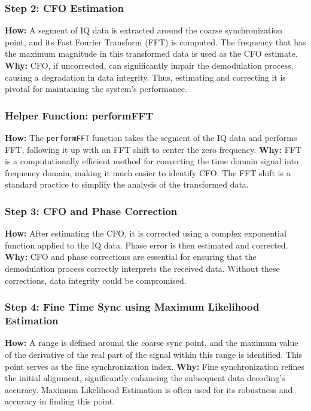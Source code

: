 \documentclass{article}
\begin{document}
\subsubsection*{Step 2: CFO Estimation}
\textbf{How:}
A segment of IQ data is extracted around the coarse synchronization point, and its Fast Fourier Transform (FFT) is computed. The frequency that has the maximum magnitude in this transformed data is used as the CFO estimate.
\newline \textbf{Why:}
CFO, if uncorrected, can significantly impair the demodulation process, causing a degradation in data integrity. Thus, estimating and correcting it is pivotal for maintaining the system's performance.

\subsubsection*{Helper Function: performFFT}
\textbf{How:}
The \texttt{performFFT} function takes the segment of the IQ data and performs FFT, following it up with an FFT shift to center the zero frequency.
\newline\newline \textbf{Why:}
FFT is a computationally efficient method for converting the time domain signal into frequency domain, making it much easier to identify CFO. The FFT shift is a standard practice to simplify the analysis of the transformed data.

\subsubsection*{Step 3: CFO and Phase Correction}
\textbf{How:}
After estimating the CFO, it is corrected using a complex exponential function applied to the IQ data. Phase error is then estimated and corrected.
\newline \textbf{Why:}
CFO and phase corrections are essential for ensuring that the demodulation process correctly interprets the received data. Without these corrections, data integrity could be compromised.

\subsubsection*{Step 4: Fine Time Sync using Maximum Likelihood Estimation}
\textbf{How:}
A range is defined around the coarse sync point, and the maximum value of the derivative of the real part of the signal within this range is identified. This point serves as the fine synchronization index.
\newline \textbf{Why:}
Fine synchronization refines the initial alignment, significantly enhancing the subsequent data decoding's accuracy. Maximum Likelihood Estimation is often used for its robustness and accuracy in finding this point.
\end{document}
